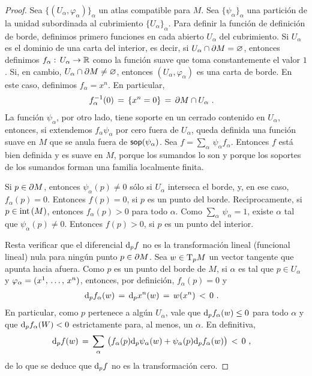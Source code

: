 \begin{proof}
	Sea $\{(U_{\alpha},\varphi_{\alpha})\}_{\alpha}$ un atlas compatible
	para $M$. Sea $\{\psi_{\alpha}\}_{\alpha}$ una partici\'{o}n
	de la unidad subordinada al cubrimiento $\{U_{\alpha}\}_{\alpha}$.
	Para definir la funci\'{o}n de definici\'{o}n de borde, definimos
	primero funciones en cada abierto $U_{\alpha}$ del cubrimiento.
	Si $U_{\alpha}$ es el dominio de una carta del interior,
	es decir, si $U_{\alpha}\cap\borde[M]=\varnothing$, entonces
	definimos $f_{\alpha}:\,U_{\alpha}\rightarrow\bb{R}$ como la
	funci\'{o}n suave que toma constantemente el valor $1$. Si, en cambio,
	$U_{\alpha}\cap\borde[M]\not=\varnothing$, entonces
	$(U_{\alpha},\varphi_{\alpha})$ es una carta de borde. En este caso,
	definimos $f_{\alpha}=x^{n}$. En particular,
	\begin{align*}
		f_{\alpha}^{-1}(0) & \,=\,\{x^{n}=0\} \,=\,
		\borde[M]\cap U_{\alpha}
		\text{ .}
	\end{align*}
	La funci\'{o}n $\psi_{\alpha}$, por otro lado, tiene soporte en
	un cerrado contenido en $U_{\alpha}$, entonces, si extendemos
	$f_{\alpha}\psi_{\alpha}$ por cero fuera de $U_{\alpha}$, queda
	definida una funci\'{o}n suave en $M$ que se anula fuera
	de $\soporte{\psi_{\alpha}}$. Sea
	$f=\sum_{\alpha}\,\psi_{\alpha}f_{\alpha}$. Entonces $f$ est\'{a}
	bien definida y es suave en $M$, porque los sumandos lo son y porque
	los soportes de los sumandos forman una familia localmente
	finita.

	Si $p\in\borde[M]$, entonces $\psi_{\alpha}(p)\not=0$ s\'{o}lo si
	$U_{\alpha}$ interseca el borde, y, en ese caso, $f_{\alpha}(p)=0$.
	Entonces $f(p)=0$, si $p$ es un punto del borde. Rec\'{\i}procamente,
	si $p\in\interior{M}$, entonces $f_{\alpha}(p)>0$ para todo $\alpha$.
	Como $\sum_{\alpha}\,\psi_{\alpha}=1$, existe $\alpha$ tal que
	$\psi_{\alpha}(p)\not =0$. Entonces $f(p)>0$, si $p$ es un punto
	del interior.

	Resta verificar que el diferencial $\diferencial[p]{f}$ no es la
	transformaci\'{o}n lineal (funcional lineal) nula para ning\'{u}n
	punto $p\in\borde[M]$. Sea $w\in\tangente[p]{M}$ un vector tangente
	que apunta hacia afuera. Como $p$ es un punto del borde de $M$,
	si $\alpha$ es tal que $p\in U_{\alpha}$ y
	$\varphi_{\alpha}=(\lista*{x}{n})$, entonces, por definici\'{o}n,
	$f_{\alpha}(p)=0$ y
	\begin{align*}
		\diferencial[p]{f_{\alpha}}(w) & \,=\,
			\diferencial[p]{x^{n}}(w) \,=\,w(x^{n})\,<\,0
		\text{ .}
	\end{align*}
	En particular, como $p$ pertenece a alg\'{u}n $U_{\alpha}$,
	vale que $\diferencial[p]{f_{\alpha}}(w)\leq 0$ para todo
	$\alpha$ y que $\diferencial[p]{f_{\alpha}}(W)<0$ estrictamente
	para, al menos, un $\alpha$. En definitiva,
	\begin{align*}
		\diferencial[p]{f}(w) & \,=\,\sum_{\alpha}\,\big(
			f_{\alpha}(p)\diferencial[p]{\psi_{\alpha}}(w) +
			\psi_{\alpha}(p)\diferencial[p]{f_{\alpha}}(w)
			\big)
			\,<\,0
		\text{ ,}
	\end{align*}
	de lo que se deduce que $\diferencial[p]{f}$ no es la
	transformaci\'{o}n cero.
\end{proof}

